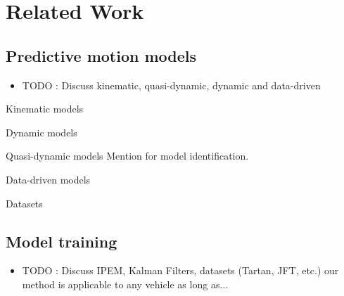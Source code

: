 \section{Related Work}

\lightlipsum[1]

\subsection{Predictive motion models}

\begin{itemize}
	\item TODO : Discuss kinematic, quasi-dynamic, dynamic and data-driven
\end{itemize}

Kinematic models
\citep{Anousaki2004}
\citep{Mandow2007}
\citep{Wang2015}
\citep{Baril2020}

Dynamic models
\citep{Yu2009}
\citep{Seegmiller2016}
\citep{Yang2022}

Quasi-dynamic models
\citep{Seegmiller2014}
\citep{Ostafew2016}
\citep{Rabiee2019}
\citep{Takemura2021}
Mention \citep{Seegmiller2013} for model identification.

Data-driven models
\citep{Williams2018}
\citep{Nagariya2020}
\citep{Tremblay2021}

\lightlipsum[1-3]

Datasets
\citep{Triest2022}


\subsection{Model training}

\begin{itemize}
	\item TODO : Discuss IPEM, Kalman Filters, datasets (Tartan, JFT, etc.) our method is applicable to any vehicle as long as...
\end{itemize}

\lightlipsum[1-3]
